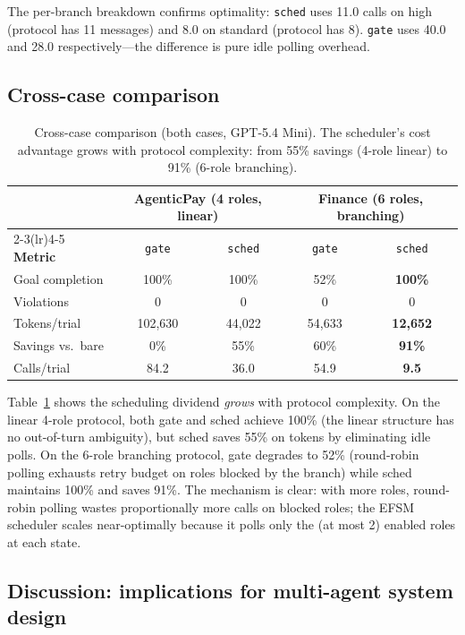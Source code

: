 The per-branch breakdown confirms optimality:
\texttt{sched} uses 11.0 calls on high (protocol has 11 messages) and
8.0 on standard (protocol has 8).
\texttt{gate} uses 40.0 and 28.0 respectively---the difference is pure
idle polling overhead.

\subsection{Cross-case comparison}\label{sec:crosscase}

\begin{table}[t]
\centering\small
\caption{Cross-case comparison (both cases, GPT-5.4 Mini).
The scheduler's cost advantage grows with protocol complexity:
from 55\% savings (4-role linear) to 91\% (6-role branching).}
\label{tab:crosscase}
\begin{tabular}{@{}l cc cc@{}}
\toprule
& \multicolumn{2}{c}{\textbf{AgenticPay (4 roles, linear)}}
& \multicolumn{2}{c}{\textbf{Finance (6 roles, branching)}} \\
\cmidrule(lr){2-3}\cmidrule(lr){4-5}
\textbf{Metric} & \texttt{gate} & \texttt{sched}
               & \texttt{gate} & \texttt{sched} \\
\midrule
Goal completion & 100\% & 100\% & 52\% & \textbf{100\%} \\
Violations & 0 & 0 & 0 & 0 \\
Tokens/trial & 102{,}630 & 44{,}022 & 54{,}633 & \textbf{12{,}652} \\
Savings vs.\ bare & 0\% & 55\% & 60\% & \textbf{91\%} \\
Calls/trial & 84.2 & 36.0 & 54.9 & \textbf{9.5} \\
\bottomrule
\end{tabular}
\end{table}

Table~\ref{tab:crosscase} shows the scheduling dividend \emph{grows}
with protocol complexity.
On the linear 4-role protocol, both gate and sched achieve 100\%
(the linear structure has no out-of-turn ambiguity), but sched saves
55\% on tokens by eliminating idle polls.
On the 6-role branching protocol, gate degrades to 52\% (round-robin
polling exhausts retry budget on roles blocked by the branch) while
sched maintains 100\% and saves 91\%.
The mechanism is clear: with more roles, round-robin polling wastes
proportionally more calls on blocked roles; the EFSM scheduler scales
near-optimally because it polls only the (at most 2) enabled roles
at each state.

\subsection{Discussion: implications for multi-agent system design}

